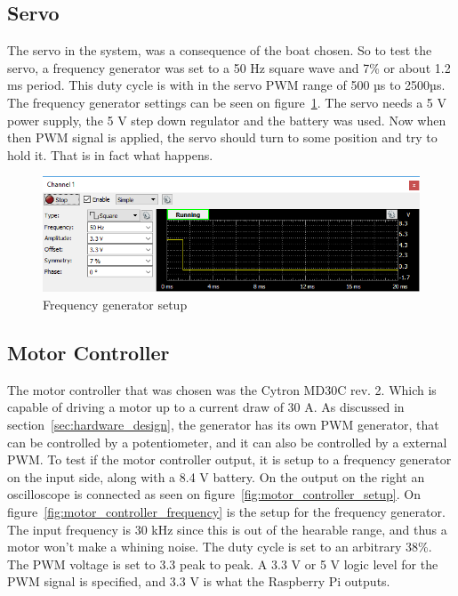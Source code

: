 \subsection{Servo}
The servo in the system, was a consequence of the boat chosen.  So to test the servo, a frequency generator was set to a 50 Hz square wave and 7\% or about 1.2 ms period. This duty cycle is with in the servo PWM range of 500 µs to 2500µs. The frequency generator settings can be seen on figure~\ref{fig:servopwmtest}. The servo needs a 5 V power supply, the 5 V step down regulator and the battery was used. Now when then PWM signal is applied, the servo should turn to some position and try to hold it. That is in fact what happens. 

\begin{figure}[h]
\centering
\includegraphics[width=0.7\linewidth]{Images/Implementation/Servo_PWM_test}
\caption{Frequency generator setup}
\label{fig:servopwmtest}
\end{figure}

\subsection{Motor Controller}
\label{sec:motor_controller}
The motor controller that was chosen was the Cytron MD30C rev. 2. Which is capable of driving a motor up to a current draw of 30 A. As discussed in section~\ref{sec:hardware_design}, the generator has its own PWM generator, that can be controlled by a potentiometer, and it can also be controlled by a external PWM. To test if the motor controller output, it is setup to a frequency generator on the input side, along with a 8.4 V battery. On the output on the right an oscilloscope is connected as seen on figure~\ref{fig:motor_controller_setup}. On figure~\ref{fig:motor_controller_frequency} is the setup for the frequency generator. The input frequency is 30 kHz since this is out of the hearable range, and thus a motor won't make a whining noise. The duty cycle is set to an arbitrary 38\%. The PWM voltage is set to 3.3 peak to peak. A 3.3 V or 5 V logic level for the PWM signal is specified, and 3.3 V is what the Raspberry Pi outputs. 

